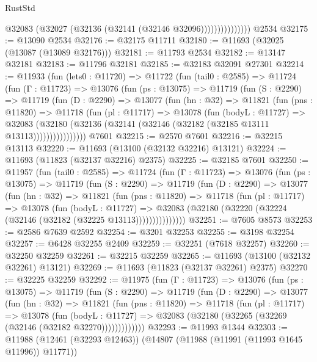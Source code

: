 \begin{lexlean}{RustStd}
\begin{coremodule}
                        @32083 (@32027 (@32136 (@32141 (@32146 @32096)))))))))))))))
    @2534
@32175 := @13090 @2534
@32176 := @32175 @11711
@32180 := @11693 (@32025 (@13087 (@13089 @32176)))
@32181 := @11793 @2534
@32182 := @13147 @32181
@32183 := @11796 @32181
@32185 := @32183 @32091 @27301
@32214 := @11933
    (fun (lets0 : @11720) =>
    @11722
      (fun (tail0 : @2585) =>
      @11724
        (fun (Γ : @11723) =>
        @13076
          (fun (ps : @13075) =>
          @11719
            (fun (S : @2290) =>
            @11719
              (fun (D : @2290) =>
              @13077
                (fun (hn : @32) =>
                @11821
                  (fun (pns : @11820) =>
                  @11718
                    (fun (pl : @11717) =>
                    @13078
                      (fun (bodyL : @11727) =>
                      @32083
                        (@32180
                          (@32136 (@32141 (@32146 (@32182 (@32185 @13111 @13113))))))))))))))))
    @7601
@32215 := @2570 @7601
@32216 := @32215 @13113
@32220 := @11693 (@13100 (@32132 @32216) @13121)
@32224 := @11693 (@11823 (@32137 @32216) @2375)
@32225 := @32185 @7601
@32250 := @11957
    (fun (tail0 : @2585) =>
    @11724
      (fun (Γ : @11723) =>
      @13076
        (fun (ps : @13075) =>
        @11719
          (fun (S : @2290) =>
          @11719
            (fun (D : @2290) =>
            @13077
              (fun (hn : @32) =>
              @11821
                (fun (pns : @11820) =>
                @11718
                  (fun (pl : @11717) =>
                  @13078
                    (fun (bodyL : @11727) =>
                    @32083 (@32180 (@32220 (@32224 (@32146 (@32182 (@32225 @13113)))))))))))))))
@32251 := @7605 @8573
@32253 := @2586 @7639 @2592
@32254 := @3201 @32253
@32255 := @3198 @32254
@32257 := @6428 @32255 @2409
@32259 := @32251 (@7618 @32257)
@32260 := @32250 @32259
@32261 := @32215 @32259
@32265 := @11693 (@13100 (@32132 @32261) @13121)
@32269 := @11693 (@11823 (@32137 @32261) @2375)
@32270 := @32225 @32259
@32292 := @11975
    (fun (Γ : @11723) =>
    @13076
      (fun (ps : @13075) =>
      @11719
        (fun (S : @2290) =>
        @11719
          (fun (D : @2290) =>
          @13077
            (fun (hn : @32) =>
            @11821
              (fun (pns : @11820) =>
              @11718
                (fun (pl : @11717) =>
                @13078
                  (fun (bodyL : @11727) =>
                  @32083 (@32180 (@32265 (@32269 (@32146 (@32182 @32270)))))))))))))
@32293 := @11993 @1344
@32303 := @11988 (@12461 (@32293 @12463)) (@14807 (@11988 (@11991 (@11993 @1645 @11996)) @11771))

\end{coremodule}
\end{lexlean}
